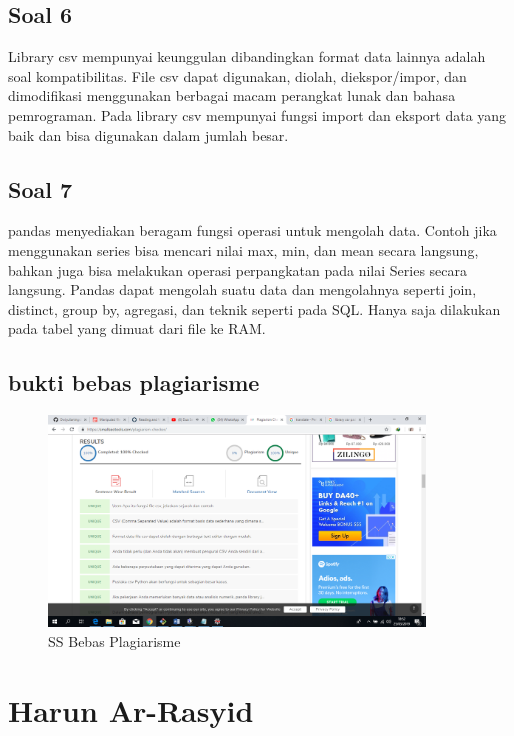 \begin{enumerate}
\subsection{Soal 6}
 Library csv mempunyai keunggulan dibandingkan format data lainnya adalah soal kompatibilitas. File csv dapat digunakan, diolah, diekspor/impor, dan dimodifikasi menggunakan berbagai macam perangkat lunak dan bahasa pemrograman. Pada library csv mempunyai fungsi import dan eksport data yang baik dan bisa digunakan dalam jumlah besar.

\subsection{Soal 7}
pandas menyediakan beragam fungsi operasi untuk mengolah data. Contoh jika menggunakan series bisa mencari nilai max, min, dan mean secara langsung, bahkan juga bisa melakukan operasi perpangkatan pada nilai Series secara langsung.
Pandas dapat mengolah suatu data dan mengolahnya seperti join, distinct, group by, agregasi, dan teknik seperti pada SQL. Hanya saja dilakukan pada tabel yang dimuat dari file ke RAM.
\end{enumerate}

\subsection{bukti bebas plagiarisme}
\begin{figure}[H]
\centering
\includegraphics[width=10cm]{figures/4/1174009/yuli.png}
\caption{SS Bebas Plagiarisme}
\label{dwiyul}
\end{figure}


\section{Harun Ar-Rasyid}

